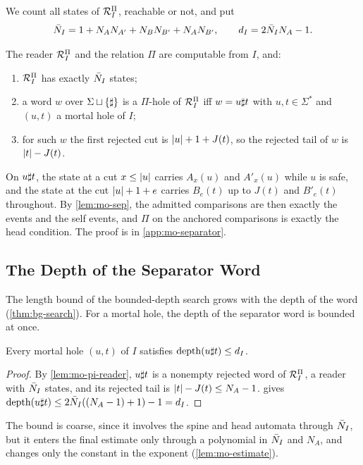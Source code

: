 We count all states of $\mathcal{R}^{\Pi}_I$, reachable or not, and put
\[
 \bar N_I=1+N_AN_{A'}+N_BN_{B'}+N_AN_{B'},\qquad d_I=2\bar N_I N_A-1 .
\]

\begin{lemma}\label{lem:mo-pi-reader}
The reader $\mathcal{R}^{\Pi}_I$ and the relation $\Pi$ are computable from $I$, and:
\begin{enumerate}[label=(\roman*),leftmargin=*]
\item $\mathcal{R}^{\Pi}_I$ has exactly $\bar N_I$ states;
\item a word $w$ over $\Sigma\sqcup\{\sharp\}$ is a $\Pi$-hole of $\mathcal{R}^{\Pi}_I$ iff
  $w=u\sharp t$ with $u,t\in\Sigma^*$ and $(u,t)$ a mortal hole of $I$;
\item for such $w$ the first rejected cut is $\lvert u\rvert+1+J(t)$, so the rejected
  tail of $w$ is $\lvert t\rvert-J(t)$.
\end{enumerate}
\end{lemma}

On $u\sharp t$, the state at a cut $x\le\lvert u\rvert$ carries $A_x(u)$ and $A'_x(u)$
while $u$ is safe, and the state at the cut $\lvert u\rvert+1+e$ carries $B_e(t)$ up to
$J(t)$ and $B'_e(t)$ throughout. By \cref{lem:mo-sep}, the admitted comparisons
are then exactly the events and the self events, and $\Pi$ on the anchored
comparisons is exactly the head condition. The proof is in
\cref{app:mo-separator}.

\subsection{The Depth of the Separator Word}\label{sec:mo-depth}

The length bound of the bounded-depth search grows with the depth of the word
(\cref{thm:bg-search}). For a mortal hole, the depth of the separator word is
bounded at once.

\begin{lemma}\label{lem:mo-depth}
Every mortal hole $(u,t)$ of $I$ satisfies $\operatorname{depth}(u\sharp t)\le d_I$.
\end{lemma}

\begin{proof}
By \cref{lem:mo-pi-reader}, $u\sharp t$ is a nonempty rejected word of
$\mathcal{R}^{\Pi}_I$, a reader with $\bar N_I$ states, and its rejected tail is
$\lvert t\rvert-J(t)\le N_A-1$.  gives
$\operatorname{depth}(u\sharp t)\le2\bar N_I((N_A-1)+1)-1=d_I$.
\end{proof}

The bound is coarse, since it involves the spine and head automata through
$\bar N_I$, but it enters the final estimate only through a polynomial in $\bar N_I$
and $N_A$, and changes only the constant in the exponent
(\cref{lem:mo-estimate}).

